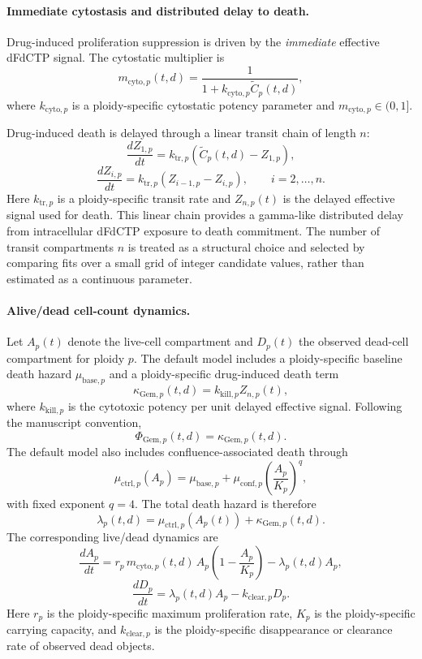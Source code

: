 \documentclass[11pt,notitlepage]{article}
\begin{document}
\paragraph{Immediate cytostasis and distributed delay to death.}
Drug-induced proliferation suppression is driven by the \emph{immediate} effective dFdCTP signal. The cytostatic multiplier is
\[
m_{\mathrm{cyto},p}(t,d)
=
\frac{1}{1+k_{\mathrm{cyto},p}\widetilde{C}_{p}(t,d)},
\]
where $k_{\mathrm{cyto},p}$ is a ploidy-specific cytostatic potency parameter and $m_{\mathrm{cyto},p}\in(0,1]$.

Drug-induced death is delayed through a linear transit chain of length $n$:
\[
\frac{dZ_{1,p}}{dt}
=
k_{\mathrm{tr},p}\left(\widetilde{C}_{p}(t,d)-Z_{1,p}\right),
\]
\[
\frac{dZ_{i,p}}{dt}
=
k_{\mathrm{tr},p}\left(Z_{i-1,p}-Z_{i,p}\right),
\qquad i=2,\ldots,n.
\]
Here $k_{\mathrm{tr},p}$ is a ploidy-specific transit rate and $Z_{n,p}(t)$ is the delayed effective signal used for death. This linear chain provides a gamma-like distributed delay from intracellular dFdCTP exposure to death commitment. The number of transit compartments $n$ is treated as a structural choice and selected by comparing fits over a small grid of integer candidate values, rather than estimated as a continuous parameter.

\paragraph{Alive/dead cell-count dynamics.}
Let $A_p(t)$ denote the live-cell compartment and $D_p(t)$ the observed dead-cell compartment for ploidy $p$. The default model includes a ploidy-specific baseline death hazard $\mu_{\mathrm{base},p}$ and a ploidy-specific drug-induced death term
\[
\kappa_{\mathrm{Gem},p}(t,d)=k_{\mathrm{kill},p}Z_{n,p}(t),
\]
where $k_{\mathrm{kill},p}$ is the cytotoxic potency per unit delayed effective signal. Following the manuscript convention,
\[
\Phi_{\mathrm{Gem},p}(t,d)=\kappa_{\mathrm{Gem},p}(t,d).
\]
The default model also includes confluence-associated death through
\[
\mu_{\mathrm{ctrl},p}(A_p)
=
\mu_{\mathrm{base},p}
+
\mu_{\mathrm{conf},p}\left(\frac{A_p}{K_p}\right)^q,
\]
with fixed exponent $q=4$. The total death hazard is therefore
\[
\lambda_p(t,d)=\mu_{\mathrm{ctrl},p}(A_p(t))+\kappa_{\mathrm{Gem},p}(t,d).
\]
The corresponding live/dead dynamics are
\[
\frac{dA_p}{dt}
=
r_p\,m_{\mathrm{cyto},p}(t,d)\,
A_p\left(1-\frac{A_p}{K_p}\right)
-\lambda_p(t,d)A_p,
\]
\[
\frac{dD_p}{dt}
=
\lambda_p(t,d)A_p-k_{\mathrm{clear},p}D_p.
\]
Here $r_p$ is the ploidy-specific maximum proliferation rate, $K_p$ is the ploidy-specific carrying capacity, and $k_{\mathrm{clear},p}$ is the ploidy-specific disappearance or clearance rate of observed dead objects. 
\end{document}
